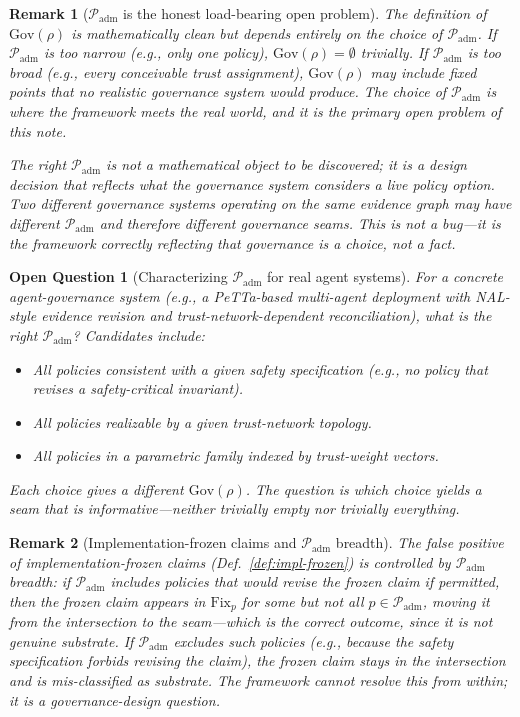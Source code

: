 \documentclass[11pt]{article}
\newtheorem{remark}{Remark}
\newtheorem{openquestion}{Open Question}
\newcommand{\Gov}{\mathrm{Gov}}
\newcommand{\Fix}{\mathrm{Fix}}
\newcommand{\Padm}{\mathcal{P}_{\mathrm{adm}}}
\begin{document}
\begin{remark}[$\Padm$ is the honest load-bearing open problem]
\label{rem:padm-open}
The definition of $\Gov(\rho)$ is mathematically clean but depends entirely on the choice of
$\Padm$. If $\Padm$ is too narrow (e.g., only one policy), $\Gov(\rho) = \emptyset$ trivially.
If $\Padm$ is too broad (e.g., every conceivable trust assignment), $\Gov(\rho)$ may include
fixed points that no realistic governance system would produce. The choice of $\Padm$ is
where the framework meets the real world, and it is the primary open problem of this note.

The right $\Padm$ is not a mathematical object to be discovered; it is a \emph{design
decision} that reflects what the governance system considers a live policy option. Two
different governance systems operating on the same evidence graph may have different $\Padm$
and therefore different governance seams. This is not a bug---it is the framework correctly
reflecting that governance is a choice, not a fact.
\end{remark}

\begin{openquestion}[Characterizing $\Padm$ for real agent systems]
\label{oq:padm}
For a concrete agent-governance system (e.g., a PeTTa-based multi-agent deployment with
NAL-style evidence revision and trust-network-dependent reconciliation), what is the right
$\Padm$? Candidates include:
\begin{itemize}
  \item All policies consistent with a given safety specification (e.g., no policy that
        revises a safety-critical invariant).
  \item All policies realizable by a given trust-network topology.
  \item All policies in a parametric family indexed by trust-weight vectors.
\end{itemize}
Each choice gives a different $\Gov(\rho)$. The question is which choice yields a seam that
is \emph{informative}---neither trivially empty nor trivially everything.
\end{openquestion}

\begin{remark}[Implementation-frozen claims and $\Padm$ breadth]
The false positive of implementation-frozen claims (Def.~\ref{def:impl-frozen}) is
controlled by $\Padm$ breadth: if $\Padm$ includes policies that would revise the frozen
claim if permitted, then the frozen claim appears in $\Fix_p$ for some but not all $p \in \Padm$,
moving it from the intersection to the seam---which is the correct outcome, since it is not
genuine substrate. If $\Padm$ excludes such policies (e.g., because the safety specification
forbids revising the claim), the frozen claim stays in the intersection and is
mis-classified as substrate. The framework cannot resolve this from within; it is a
governance-design question.
\end{remark}
\end{document}
